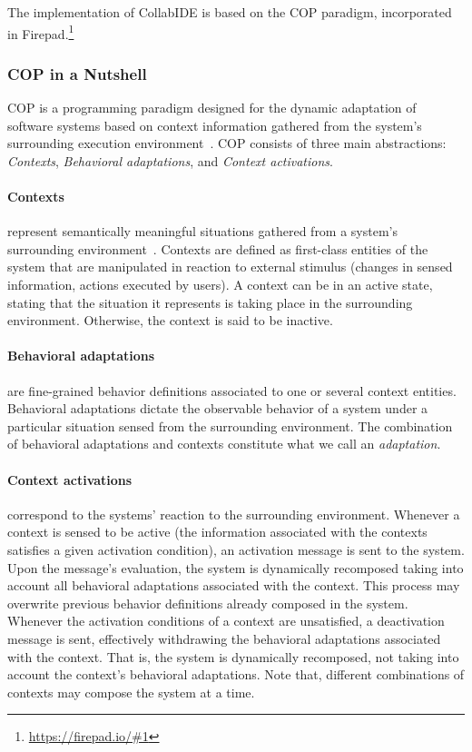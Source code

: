 The implementation of CollabIDE is based on the \acf{COP} paradigm, incorporated in Firepad.\footnote{\url{https://firepad.io/\#1}}

\subsubsection{\ac{COP} in a Nutshell}
\ac{COP} is a programming paradigm designed for the dynamic adaptation of software systems based 
on context information gathered from the system's surrounding execution 
environment~\cite{salvaneschi+12survey}. \ac{COP} consists of three main abstractions: 
\emph{Contexts}, \emph{Behavioral adaptations}, and \emph{Context activations}.

\paragraph{Contexts} represent semantically meaningful situations gathered from a system's 
surrounding environment~\cite{dey01}. Contexts are defined as first-class entities of the system that 
are manipulated in reaction to external stimulus (\eg changes in sensed information, actions executed 
by users). A context can be in an active state, stating that the situation it represents is taking place in 
the surrounding environment. Otherwise, the context is said to be inactive.

\paragraph{Behavioral adaptations} are fine-grained behavior definitions associated to one or several 
context entities. Behavioral adaptations dictate the observable behavior of a system under a particular 
situation sensed from the surrounding environment. The combination of behavioral adaptations and 
contexts constitute what we call an \emph{adaptation}.

\paragraph{Context activations} correspond to the systems' reaction to the surrounding environment. 
Whenever a context is sensed to be active (the information associated with the contexts satisfies a 
given activation condition), an activation message is sent to the system. Upon the message's 
evaluation, the system is dynamically recomposed taking into account all behavioral adaptations 
associated with the context. This process may overwrite previous behavior definitions already 
composed in the system. Whenever the activation conditions of a context are unsatisfied, a 
deactivation message is sent, effectively withdrawing the behavioral adaptations associated with the 
context. That is, the system is dynamically recomposed, not taking into account the context's 
behavioral adaptations.  Note that, different combinations of contexts may compose the system at a 
time.


